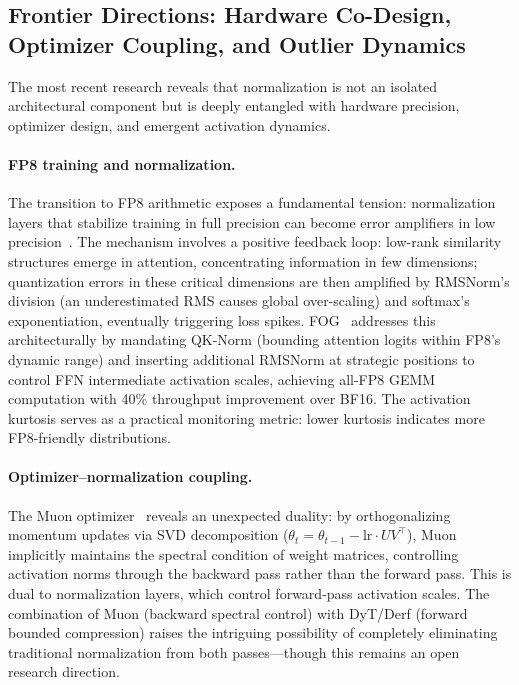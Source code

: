 \subsection{Frontier Directions: Hardware Co-Design, Optimizer Coupling, and Outlier Dynamics}

The most recent research reveals that normalization is not an isolated architectural component but is deeply entangled with hardware precision, optimizer design, and emergent activation dynamics.

\paragraph{FP8 training and normalization.}
The transition to FP8 arithmetic exposes a fundamental tension: normalization layers that stabilize training in full precision can become error amplifiers in low precision~\cite{zhang2025whylowprecision}.
The mechanism involves a positive feedback loop: low-rank similarity structures emerge in attention, concentrating information in few dimensions; quantization errors in these critical dimensions are then amplified by RMSNorm's division (an underestimated RMS causes global over-scaling) and softmax's exponentiation, eventually triggering loss spikes.
FOG~\cite{sun2025fog} addresses this architecturally by mandating QK-Norm (bounding attention logits within FP8's dynamic range) and inserting additional RMSNorm at strategic positions to control FFN intermediate activation scales, achieving all-FP8 GEMM computation with 40\% throughput improvement over BF16.
The activation kurtosis serves as a practical monitoring metric: lower kurtosis indicates more FP8-friendly distributions.

\paragraph{Optimizer--normalization coupling.}
The Muon optimizer~\cite{jordan2025muon} reveals an unexpected duality: by orthogonalizing momentum updates via SVD decomposition ($\theta_t = \theta_{t-1} - \text{lr} \cdot UV^\top$), Muon implicitly maintains the spectral condition of weight matrices, controlling activation norms through the backward pass rather than the forward pass.
This is dual to normalization layers, which control forward-pass activation scales.
The combination of Muon (backward spectral control) with DyT/Derf (forward bounded compression) raises the intriguing possibility of completely eliminating traditional normalization from both passes---though this remains an open research direction.

